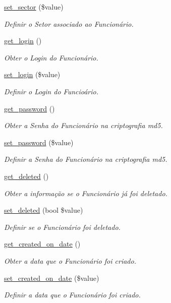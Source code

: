 \begin{DoxyCompactItemize}
\hyperlink{class_class_usuario_a0d66a3911f396de6d492ac322bf5569d}{set\+\_\+sector} (\$value)
\begin{DoxyCompactList}\small\item\em Definir o Setor associado ao Funcionário. \end{DoxyCompactList}\item 
\hyperlink{class_class_usuario_a09bc68f0d359d44f4f9a38f04fa69b0e}{get\+\_\+login} ()
\begin{DoxyCompactList}\small\item\em Obter o Login do Funcionário. \end{DoxyCompactList}\item 
\hyperlink{class_class_usuario_a81f9ed4b60bab54c829ad63c6a6134d2}{set\+\_\+login} (\$value)
\begin{DoxyCompactList}\small\item\em Definir o Login do Funcioário. \end{DoxyCompactList}\item 
\hyperlink{class_class_usuario_aded77192e5da28ea5fd228d2e5ace16a}{get\+\_\+password} ()
\begin{DoxyCompactList}\small\item\em Obter a Senha do Funcionário na criptografia md5. \end{DoxyCompactList}\item 
\hyperlink{class_class_usuario_a48fcdf09611589d13f8832d104aa2f52}{set\+\_\+password} (\$value)
\begin{DoxyCompactList}\small\item\em Definir a Senha do Funcionário na criptografia md5. \end{DoxyCompactList}\item 
\hyperlink{class_class_usuario_ad6172a0f313f12f05c08efc37a9c3656}{get\+\_\+deleted} ()
\begin{DoxyCompactList}\small\item\em Obter a informação se o Funcionário já foi deletado. \end{DoxyCompactList}\item 
\hyperlink{class_class_usuario_acd0a4e339896072e5515b8fdcc33344d}{set\+\_\+deleted} (bool \$value)
\begin{DoxyCompactList}\small\item\em Definir se o Funcionário foi deletado. \end{DoxyCompactList}\item 
\hyperlink{class_class_usuario_a9a1ef394f9aef6ab037f8bb37209242f}{get\+\_\+created\+\_\+on\+\_\+date} ()
\begin{DoxyCompactList}\small\item\em Obter a data que o Funcionário foi criado. \end{DoxyCompactList}\item 
\hyperlink{class_class_usuario_a792b5876e9d76a4f030e436aeec2a855}{set\+\_\+created\+\_\+on\+\_\+date} (\$value)
\begin{DoxyCompactList}\small\item\em Definir a data que o Funcionário foi criado. \end{DoxyCompactList}\end{DoxyCompactItemize}


